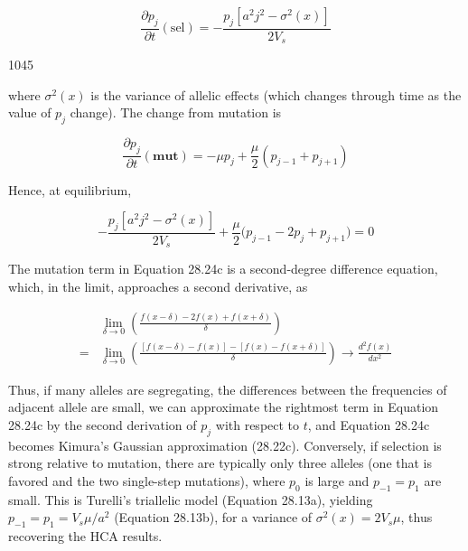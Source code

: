 \documentclass{article}
\begin{document}
\begin{equation}
\frac{\partial p_{j}}{\partial t}(\mathrm{sel})=-\frac{p_{j}[a^{2}j^{2}-\sigma^{2}(x)]}{2V_{s}}
\tag{28.24a}
\label{eq:28_24a}
\end{equation}

1045

where  $ \sigma^{2}(x) $ is the variance of allelic effects (which changes through time as the value of  $ p_{j} $ change). The change from mutation is

\begin{equation}
\frac{\partial p_{j}}{\partial t}(\mathbf{m u t})=-\mu p_{j}+\frac{\mu}{2}\left(p_{j-1}+p_{j+1}\right)
\tag{28.24b}
\label{eq:28_24b}
\end{equation}

Hence, at equilibrium,

\begin{equation}
-\frac{p_{j}[a^{2}j^{2}-\sigma^{2}(x)]}{2V_{s}}+\frac{\mu}{2}\bigg(p_{j-1}-2p_{j}+p_{j+1}\bigg)=0
\tag{28.24c}
\label{eq:28_24c}
\end{equation}

The mutation term in Equation 28.24c is a second-degree difference equation, which, in the limit, approaches a second derivative, as

\begin{equation}
\begin{aligned}&\lim_{\delta\rightarrow0}\left(\frac{f(x-\delta)-2f(x)+f(x+\delta)}{\delta}\right)\\=&\lim_{\delta\rightarrow0}\left(\frac{[f(x-\delta)-f(x)]-[f(x)-f(x+\delta)]}{\delta}\right)\rightarrow\frac{d^{2}f(x)}{dx^{2}}\end{aligned}
\end{equation}

Thus, if many alleles are segregating, the differences between the frequencies of adjacent allele are small, we can approximate the rightmost term in Equation 28.24c by the second derivation of $p_j$ with respect to $t$, and Equation 28.24c becomes Kimura's Gaussian approximation (28.22c). Conversely, if selection is strong relative to mutation, there are typically only three alleles (one that is favored and the two single-step mutations), where $p_0$ is large and $p_{-1} = p_1$ are small. This is Turelli's triallelic model (Equation 28.13a), yielding $p_{-1} = p_1 = V_s\mu/a^2$ (Equation 28.13b), for a variance of $\sigma^2(x) = 2V_s\mu$, thus recovering the HCA results.
\end{document}

